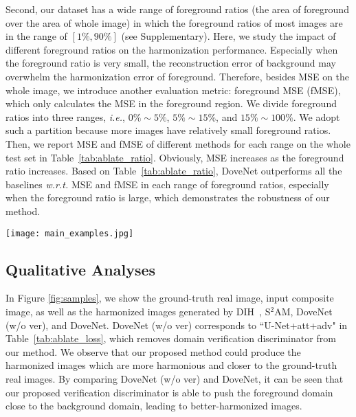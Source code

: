 \documentclass[10pt,twocolumn,letterpaper]{article}
\begin{document}
Second, our dataset has a wide range of foreground ratios (the area of foreground over the area of whole image) in which the foreground ratios of most images are in the range of $[1\%,90\%]$ (see Supplementary). Here, we study the impact of different foreground ratios on the harmonization performance. Especially when the foreground ratio is very small, the reconstruction error of background may overwhelm the harmonization error of foreground. Therefore, besides MSE on the whole image, we introduce another evaluation metric: foreground MSE (fMSE), which only calculates the MSE in the foreground region. We divide foreground ratios into three ranges, \emph{i.e.}, $0\%\sim5\%$, $5\%\sim 15\%$, and $15\%\sim100\%$.
We adopt such a partition because more images have relatively small foreground ratios.
Then, we report MSE and fMSE of different methods for each range on the whole test set in Table~\ref{tab:ablate_ratio}. Obviously, MSE increases as the foreground ratio increases.
Based on Table~\ref{tab:ablate_ratio}, DoveNet outperforms all the baselines \emph{w.r.t.} MSE and fMSE in each range of foreground ratios, especially when the foreground ratio is large, which demonstrates the robustness of our method.


\begin{figure*}[t]
\centering
\texttt{[image: main\_examples.jpg]}
\caption[]{Example results of different methods on our four sub-datasets. From top to bottom, we show one example from our HAdobe5k, HCOCO, Hday2night, and HFlickr sub-dataset respectively. From left to right, we show the ground-truth real image, input composite image, DIH~\cite{tsai2017deep}, S$^2$AM\cite{xiaodong2019improving}, our special case DoveNet (w/o ver) and our full method DoveNet.}
\label{fig:samples}
\end{figure*}


\subsection{Qualitative Analyses}
In Figure \ref{fig:samples}, we show the ground-truth real image, input composite image, as well as the harmonized images generated by DIH~\cite{tsai2017deep}, S$^2$AM\cite{xiaodong2019improving}, DoveNet (w/o ver), and DoveNet. DoveNet (w/o ver) corresponds to ``U-Net+att+adv" in Table~\ref{tab:ablate_loss}, which removes domain verification discriminator from our method.
We observe that our proposed method could produce the harmonized images which are more harmonious and closer to the ground-truth real images. By comparing DoveNet (w/o ver) and DoveNet, it can be seen that our proposed verification discriminator is able to push the foreground domain close to the background domain, leading to better-harmonized images.
\end{document}
